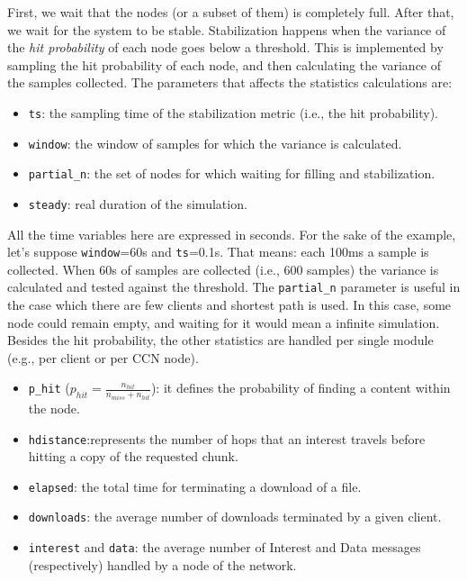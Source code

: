 \documentclass{book}
\begin{document}
First, we wait that the nodes (or a subset of them) is completely full. After that, we wait for the system to be stable. Stabilization happens when the variance of the \emph{hit probability} of each node goes below a threshold. This is implemented by sampling the hit probability of each node, and then calculating the variance of the samples collected.  The parameters that affects the statistics calculations are:
\begin{itemize}
    \item \verb|ts|: the sampling time of the stabilization metric (i.e., the hit probability). 
    \item \verb|window|: the window of samples for which the variance is calculated. 
    \item \verb|partial_n|: the set of nodes for which waiting for filling and stabilization.
    \item \verb|steady|: real duration of the simulation.
\end{itemize}
All the time variables here are expressed in seconds. For the sake of the example, let's suppose \verb|window|=60s and \verb|ts|=0.1s. That means: each 100ms a sample is collected. When 60s of samples are collected (i.e., 600 samples) the variance is calculated and tested against the threshold. The \verb|partial_n| parameter is useful in the case which there are few clients and shortest path is used. In this case, some node could remain empty, and waiting for it would mean a infinite simulation.
Besides the hit probability, the other statistics are handled per single module (e.g., per client or per CCN node). 
\begin{itemize}
    \item \verb|p_hit|  ($p_{hit} = \frac{n_{hit}}{n_{miss}+n_{hit}}$): it defines the probability of finding a content within the node.
    \item \verb|hdistance|:represents the number of hops that an interest travels before hitting a copy of the requested chunk.
    \item \verb|elapsed|: the total time for terminating a download of a file.
    \item \verb|downloads|: the average number of downloads terminated by a given client.
    \item \verb|interest| and \verb|data|: the average number of Interest and Data messages (respectively) handled by a node of the network. 
\end{itemize}
\end{document}
